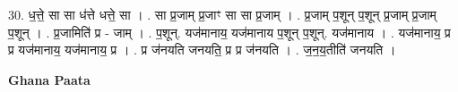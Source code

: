 \documentclass[17pt]{extarticle}
\begin{document}
30. ध॒त्ते॒ सा सा ध॑त्ते धत्ते॒ सा । . सा प्र॒जाम् प्र॒जाꣳ सा सा प्र॒जाम् । . प्र॒जाम् प॒शून् प॒शून् प्र॒जाम् प्र॒जाम् प॒शून् । . प्र॒जामिति॑ प्र - जाम् । . प॒शून्. यज॑मानाय॒ यज॑मानाय प॒शून् प॒शून्. यज॑मानाय । . यज॑मानाय॒ प्र प्र यज॑मानाय॒ यज॑मानाय॒ प्र । . प्र ज॑नयति जनयति॒ प्र प्र ज॑नयति । . ज॒न॒य॒तीति॑ जनयति । \newline

\textbf{Ghana Paata } \newline
\end{document}
